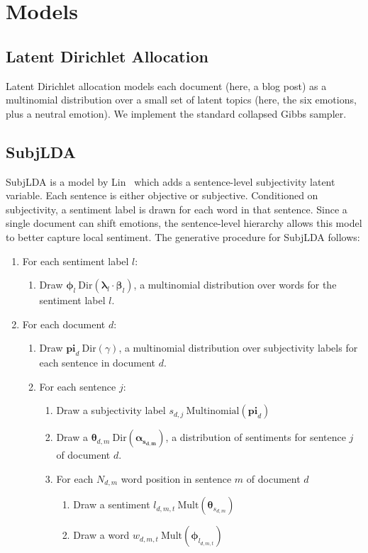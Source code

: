 \documentclass{article}
\begin{document}
\section{Models}
\subsection{Latent Dirichlet Allocation}
Latent Dirichlet allocation models each document (here, a blog post)
as a multinomial distribution over a small set of latent topics
(here, the six emotions, plus a neutral emotion). We implement the
standard collapsed Gibbs sampler.

\subsection{SubjLDA}
SubjLDA is a model by Lin~\citep{lin03} which adds a sentence-level
subjectivity latent variable. Each sentence is either objective or
subjective. Conditioned on subjectivity, a sentiment label is drawn
for each word in that sentence. Since a single document can shift
emotions, the sentence-level hierarchy allows this model to better
capture local sentiment. The generative procedure for SubjLDA follows:

\begin{enumerate}
\item For each sentiment label $l$:
\begin{enumerate}
\item Draw $\mathbf{\phi}_l ~ \mbox{Dir}(\mathbf{\lambda}_l \cdot \mathbf{\beta}_l)$, a multinomial distribution over words for the sentiment label $l$.
\end{enumerate}
\item For each document $d$:
\begin{enumerate}
\item Draw $\mathbf{pi}_d ~ \mbox{Dir}(\gamma)$, a multinomial distribution over subjectivity labels for each sentence in document $d$.
\item For each sentence $j$:
\begin{enumerate}
\item Draw a subjectivity label $s_{d,j} ~ \mbox{Multinomial}(\mathbf{pi}_d)$
\item Draw a $\mathbf{\theta}_{d,m} ~ \mbox{Dir}(\mathbf{\alpha_{s_{d,m}}})$, a distribution of sentiments for sentence $j$ of document $d$.
\item For each $N_{d,m}$ word position in sentence $m$ of document $d$
\begin{enumerate}
\item Draw a sentiment $l_{d,m,t} ~ \mbox{Mult}(\mathbf{\theta}_{s_{d,m}})$
\item Draw a word $w_{d,m,t} ~ \mbox{Mult}(\mathbf{\phi}_{l_{d,m,t}})$
\end{enumerate}
\end{enumerate}
\end{enumerate}
\end{enumerate}
\end{document}
